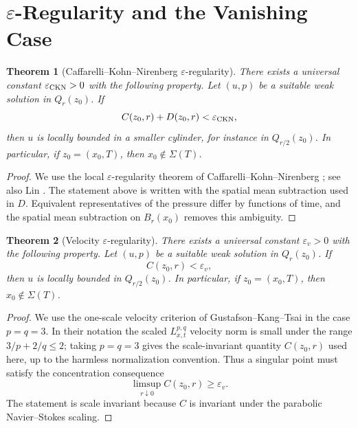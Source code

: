 \documentclass[11pt]{amsart}
\theoremstyle{plain}
\newtheorem{theorem}{Theorem}[section]
\theoremstyle{definition}
\theoremstyle{remark}
\numberwithin{equation}{section}
\begin{document}
\section{\texorpdfstring{\(\varepsilon\)-Regularity}{Epsilon-Regularity} and the Vanishing Case}

\begin{theorem}[Caffarelli--Kohn--Nirenberg \(\varepsilon\)-regularity]
\label{p0:thm:ckn}
There exists a universal constant \(\varepsilon_{\rm CKN}>0\) with the
following property.  Let \((u,p)\) be a suitable weak solution in \(Q_r(z_0)\).
If
\[
  C(z_0,r)+D(z_0,r)<\varepsilon_{\rm CKN},
\]
then \(u\) is locally bounded in a smaller cylinder, for instance in
\(Q_{r/2}(z_0)\).  In particular, if \(z_0=(x_0,T)\), then
\(x_0\notin\Sigma(T)\).
\end{theorem}

\begin{proof}
We use the local \(\varepsilon\)-regularity theorem of
Caffarelli--Kohn--Nirenberg \cite{CKN1982}; see also Lin \cite{Lin1998}.  The
statement above is written with the spatial mean subtraction used in \(D\).
Equivalent representatives of the pressure differ by functions of time, and
the spatial mean subtraction on \(B_r(x_0)\) removes this ambiguity.
\end{proof}

\begin{theorem}[Velocity \(\varepsilon\)-regularity]\label{p0:thm:velocity-ckn}
There exists a universal constant \(\varepsilon_v>0\) with the following
property.  Let \((u,p)\) be a suitable weak solution in \(Q_r(z_0)\).  If
\[
  C(z_0,r)<\varepsilon_v,
\]
then \(u\) is locally bounded in \(Q_{r/2}(z_0)\).  In particular, if
\(z_0=(x_0,T)\), then \(x_0\notin\Sigma(T)\).
\end{theorem}

\begin{proof}
We use the one-scale velocity criterion of
Gustafson--Kang--Tsai \cite{GustafsonKangTsai2007} in the case
\(p=q=3\).  In their notation the scaled \(L^{p,q}_{x,t}\) velocity norm is
small under the range \(3/p+2/q\le2\); taking \(p=q=3\) gives the
scale-invariant quantity \(C(z_0,r)\) used here, up to the harmless
normalization convention.  Thus a singular point must
satisfy the concentration consequence
\[
   \limsup_{r\downarrow0} C(z_0,r)\ge\varepsilon_v .
\]
The statement is scale invariant because \(C\) is invariant under the
parabolic Navier--Stokes scaling.
\end{proof}
\end{document}
